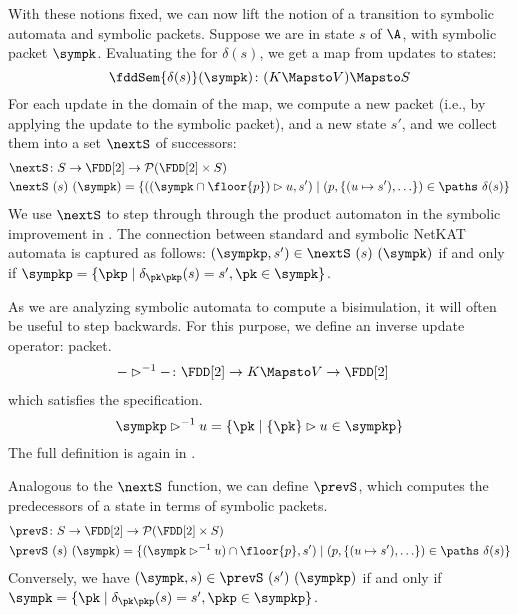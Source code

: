With these notions fixed, we can now lift the notion of a transition
to symbolic automata and symbolic packets. Suppose we are in state $s$
of $\A$, with symbolic packet $\sympk$. Evaluating the \FDD for
$\delta(s)$, we get a map from updates to states:
%
\[ \fddSem{\delta(s)}(\sympk)\colon (K \Mapsto V) \Mapsto S \]
%
For each update in the domain of the map, we compute a new packet
(i.e., by applying the update to the symbolic packet), and a new state
$s'$, and we collect them into a set $\nextS$ of successors:
%
\begin{align*}
    &\nextS\colon S \to \FDD[2] \to  \mathcal{P}(\FDD[2] \times S)\\
    &\nextS\ (s)\ (\sympk) = \{((\sympk \cap \floor{p}) \rhd u, s') \mid (p,
    \{(u \mapsto s'), \ldots\})\in \paths\ {\delta(s)}\}\\
\end{align*}
%
We use $\nextS$ to step through through the product automaton in the
symbolic improvement in .
%
The connection between standard and symbolic NetKAT automata is
captured as follows: $(\sympkp, s') \in \nextS\ (s)\ (\sympk)$ if and
only if $\sympkp = \{ \pkp \mid \delta_{\pk\pkp}(s) = s',
\pk\in\sympk\}$.

As we are analyzing symbolic automata to compute a bisimulation, it
will often be useful to step backwards. For this purpose, we define an
inverse update operator:
packet.
%
\begin{align*}
    - &\rhd^{-1} - \colon \FDD[2] \to K \Mapsto V \to \FDD[2]
\end{align*}
%
which satisfies the specification.
%
\[
    \sympkp \rhd^{-1} u = \{\pk \mid \{\pk\} \rhd u \in \sympkp\}
\]
The full definition is again in .

Analogous to the $\nextS$ function, we can define $\prevS$, which
computes the predecessors of a state in terms of symbolic packets.
%
\begin{align*}
    &\prevS\colon S \to \FDD[2] \to \mathcal{P}(\FDD[2] \times S)\\
    &\prevS\ (s)\ (\sympk) = \{(\sympk \rhd^{-1} u) \cap \floor{p}, s') \mid (p, \{(u\mapsto s'),\ldots\})\in \paths\ {\delta(s)}\}
\end{align*}
%
Conversely, we have $(\sympk, s) \in \prevS\ (s')\ (\sympkp)$ if and only if
$\sympk = \{ \pk \mid \delta_{\pk\pkp}(s) = s', \pkp\in\sympkp\}$.